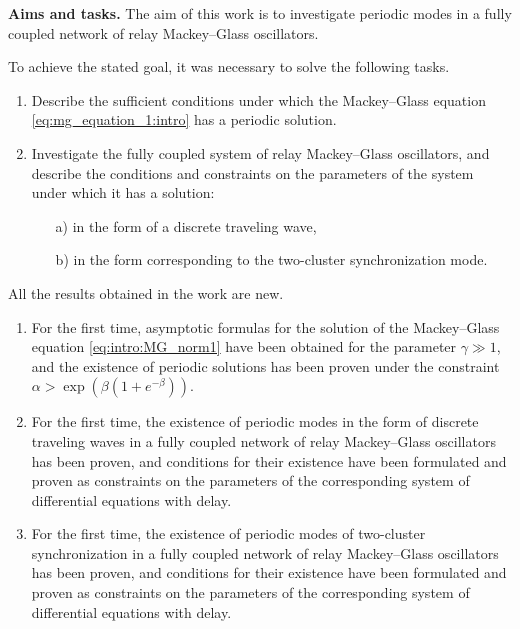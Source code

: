 %
%

\bigskip

\textbf{Aims and tasks.} The aim of this work is to investigate periodic modes in a fully coupled network of relay Mackey--Glass oscillators.

To achieve the stated goal, it was necessary to solve the following tasks.
\begin{enumerate}[beginpenalty=10000] %
	\item Describe the sufficient conditions under which the Mackey--Glass equation \eqref{eq:mg_equation_1:intro} has a periodic solution.
	\item Investigate the fully coupled system of relay Mackey--Glass oscillators, and describe the conditions and constraints on the parameters of the system under which it has a solution:
	\begin{enumerate}
		\item[a)]in the form of a discrete traveling wave,
		\item[b)]in the form corresponding to the two-cluster synchronization mode.
	\end{enumerate}
\end{enumerate}

\bigskip

{\novelty} All the results obtained in the work are new.
\begin{enumerate}[beginpenalty=10000] %
	\item For the first time, asymptotic formulas for the solution of the Mackey--Glass equation \eqref{eq:intro:MG_norm1} have been obtained for the parameter $\gamma \gg 1$, and the existence of periodic solutions has been proven under the constraint  $\alpha > \exp\left(\beta(1 + e^{-\beta})\right)$.
	\item For the first time, the existence of periodic modes in the form of discrete traveling waves in a fully coupled network of relay Mackey--Glass oscillators has been proven, and conditions for their existence have been formulated and proven as constraints on the parameters of the corresponding system of differential equations with delay.
	\item For the first time, the existence of periodic modes of two-cluster synchronization in a fully coupled network of relay Mackey--Glass oscillators has been proven, and conditions for their existence have been formulated and proven as constraints on the parameters of the corresponding system of differential equations with delay.
\end{enumerate}

